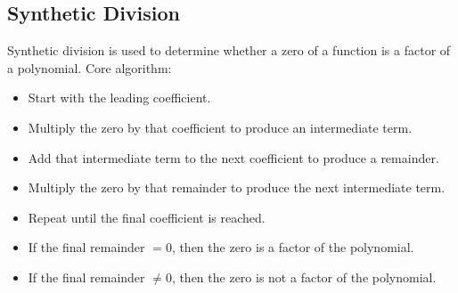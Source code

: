 \subsection{Synthetic Division}
    Synthetic division is used to determine whether a zero of a function
    is a factor of a polynomial.
    Core algorithm:
    \begin{itemize}
        \item Start with the leading coefficient.
        \item Multiply the zero by that coefficient to produce an intermediate term. 
        \item Add that intermediate term to the next coefficient to produce a remainder.
        \item Multiply the zero by that remainder to produce the next intermediate term.
        \item Repeat until the final coefficient is reached.
        \item If the final remainder $= 0$, then the zero is a factor of the polynomial.
        \item If the final remainder $\neq 0$, then the zero is not a factor of the polynomial.
    \end{itemize}
    \newpage
    \inputminted[linenos, breaklines]{python}{001/section_2/synthetic_division.py}
    \newpage
